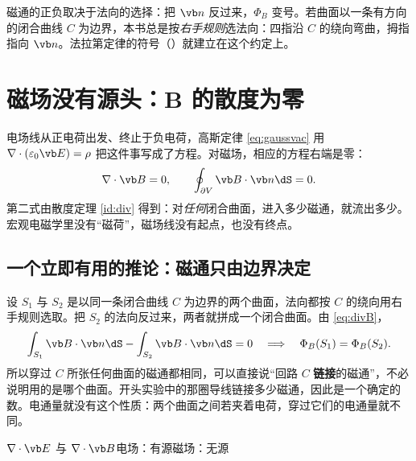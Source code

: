 磁通的正负取决于法向的选择：把 $\vb n$ 反过来，$\Phi_B$ 变号。若曲面以一条有方向的闭合曲线 $C$ 为边界，本书总是按\emph{右手规则}选法向：四指沿 $C$ 的绕向弯曲，拇指指向 $\vb n$。法拉第定律的符号（）就建立在这个约定上。

\section{磁场没有源头：B 的散度为零}\label{sec:magnetic-divB}

电场线从正电荷出发、终止于负电荷，高斯定律 \eqref{eq:gaussvac} 用 $\nabla\cdot(\varepsilon_0\vb E)=\rho$ 把这件事写成了方程。对磁场，相应的方程右端是零：
\begin{equation}
\nabla\cdot\vb B=0,\qquad \oint_{\partial V}\vb B\cdot\vb n\dS=0 .
\label{eq:divB}
\end{equation}
第二式由散度定理 \eqref{id:div} 得到：对\emph{任何}闭合曲面，进入多少磁通，就流出多少。宏观电磁学里没有“磁荷”，磁场线没有起点，也没有终点。

\subsection{一个立即有用的推论：磁通只由边界决定}
设 $S_1$ 与 $S_2$ 是以同一条闭合曲线 $C$ 为边界的两个曲面，法向都按 $C$ 的绕向用右手规则选取。把 $S_2$ 的法向反过来，两者就拼成一个闭合曲面。由 \eqref{eq:divB}，
\begin{equation}
\int_{S_1}\vb B\cdot\vb n\dS-\int_{S_2}\vb B\cdot\vb n\dS=0
\quad\Longrightarrow\quad \Phi_B(S_1)=\Phi_B(S_2).
\end{equation}
所以穿过 $C$ 所张任何曲面的磁通都相同，可以直接说“回路 $C$ \textbf{链接}的磁通”，不必说明用的是哪个曲面。开头实验中的那圈导线链接多少磁通，因此是一个确定的数。电通量就没有这个性质：两个曲面之间若夹着电荷，穿过它们的电通量就不同。

\begin{compare}{$\nabla\cdot\vb E$ 与 $\nabla\cdot\vb B$}{电场：有源}{磁场：无源}
\end{compare}

